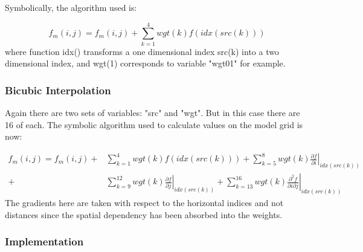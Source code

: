 \documentclass[NEMO_book]{subfiles}
\begin{document}
Symbolically, the algorithm used is:

\begin{equation}
f_{m}(i,j) = f_{m}(i,j) + \sum_{k=1}^{4} {wgt(k)f(idx(src(k)))}
\end{equation}
where function idx() transforms a one dimensional index src(k) into a two dimensional index,
and wgt(1) corresponds to variable "wgt01" for example.

\subsubsection{Bicubic Interpolation}
\label{SBC_iof_bicubic}

Again there are two sets of variables: "src" and "wgt".
But in this case there are 16 of each.
The symbolic algorithm used to calculate values on the model grid is now:

\begin{equation*} \begin{split}
f_{m}(i,j) =  f_{m}(i,j) +& \sum_{k=1}^{4} {wgt(k)f(idx(src(k)))}     
              +   \sum_{k=5}^{8} {wgt(k)\left.\frac{\partial f}{\partial i}\right| _{idx(src(k))} }    \\
              +& \sum_{k=9}^{12} {wgt(k)\left.\frac{\partial f}{\partial j}\right| _{idx(src(k))} }   
              +   \sum_{k=13}^{16} {wgt(k)\left.\frac{\partial ^2 f}{\partial i \partial j}\right| _{idx(src(k))} }
\end{split}
\end{equation*}
The gradients here are taken with respect to the horizontal indices and not distances since the spatial dependency has been absorbed into the weights.

\subsubsection{Implementation}
\label{SBC_iof_imp}
\end{document}
